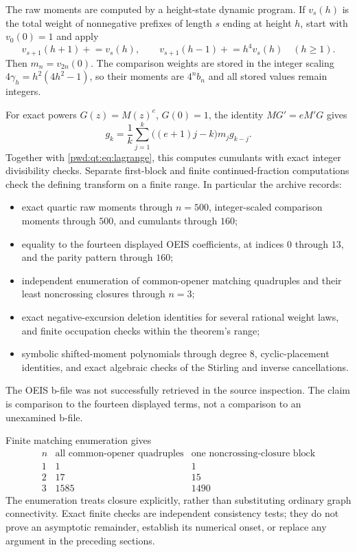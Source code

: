 \documentclass[11pt,letterpaper]{article}
\numberwithin{equation}{section}
\theoremstyle{remark}\newtheorem{remark}[theorem]{Remark}
\begin{document}
The raw moments are computed by a height-state dynamic program. If $v_s(h)$ is the total weight of nonnegative prefixes of length $s$ ending at height $h$, start with $v_0(0)=1$ and apply
\[
 v_{s+1}(h+1)\mathrel{+}=v_s(h),\qquad
 v_{s+1}(h-1)\mathrel{+}=h^4v_s(h)\quad(h\ge1).
\]
Then $m_n=v_{2n}(0)$. The comparison weights are stored in the integer scaling $4\gamma_h=h^2(4h^2-1)$, so their moments are $4^nb_n$ and all stored values remain integers.

For exact powers $G(z)=M(z)^e$, $G(0)=1$, the identity $MG'=eM'G$ gives
\begin{equation}\label{pwd:qt:eq:power-code}
 g_k=\frac1k\sum_{j=1}^k\bigl((e+1)j-k\bigr)m_jg_{k-j}.
\end{equation}
Together with \eqref{pwd:qt:eq:lagrange}, this computes cumulants with exact integer divisibility checks. Separate first-block and finite continued-fraction computations check the defining transform on a finite range. In particular the archive records:
\begin{itemize}[leftmargin=1.6em]
 \item exact quartic raw moments through $n=500$, integer-scaled comparison moments through $500$, and cumulants through $160$;
 \item equality to the fourteen displayed OEIS coefficients, at indices $0$ through $13$, and the parity pattern through $160$;
 \item independent enumeration of common-opener matching quadruples and their least noncrossing closures through $n=3$;
 \item exact negative-excursion deletion identities for several rational weight laws, and finite occupation checks within the theorem's range;
 \item symbolic shifted-moment polynomials through degree $8$, cyclic-placement identities, and exact algebraic checks of the Stirling and inverse cancellations.
\end{itemize}
The OEIS b-file was not successfully retrieved in the source inspection. The claim is comparison to the fourteen displayed terms, not a comparison to an unexamined b-file.

Finite matching enumeration gives
\[
\begin{array}{c|rr}
 n&\text{all common-opener quadruples}&\text{one noncrossing-closure block}\\ \hline
 1&1&1\\2&17&15\\3&1585&1490
\end{array}
\]
The enumeration treats closure explicitly, rather than substituting ordinary graph connectivity. Exact finite checks are independent consistency tests; they do not prove an asymptotic remainder, establish its numerical onset, or replace any argument in the preceding sections.
\end{document}
